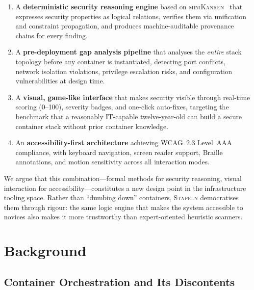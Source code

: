 \documentclass[11pt,twocolumn]{article}
\newcommand{\stapeln}{\textsc{Stapeln}\xspace}
\newcommand{\minikanren}{\textsc{miniKanren}\xspace}
\begin{document}
\begin{enumerate}[leftmargin=*]
\item A \textbf{deterministic security reasoning engine} based on
      \minikanren~\cite{byrd2010,friedman2005} that expresses security
      properties as logical relations, verifies them via unification
      and constraint propagation, and produces machine-auditable
      provenance chains for every finding.

\item A \textbf{pre-deployment gap analysis pipeline} that analyses the
      \emph{entire} stack topology before any container is instantiated,
      detecting port conflicts, network isolation violations, privilege
      escalation risks, and configuration vulnerabilities at design time.

\item A \textbf{visual, game-like interface} that makes security
      visible through real-time scoring (0--100), severity badges, and
      one-click auto-fixes, targeting the benchmark that a reasonably
      IT-capable twelve-year-old can build a secure container stack
      without prior container knowledge.

\item An \textbf{accessibility-first architecture} achieving WCAG~2.3
      Level~AAA compliance, with keyboard navigation, screen reader
      support, Braille annotations, and motion sensitivity across all
      interaction modes.
\end{enumerate}

We argue that this combination---formal methods for security reasoning,
visual interaction for accessibility---constitutes a new design point
in the infrastructure tooling space. Rather than ``dumbing down''
containers, \stapeln democratises them through rigour: the same logic
engine that makes the system accessible to novices also makes it more
trustworthy than expert-oriented heuristic scanners.


\section{Background}
\label{sec:background}

\subsection{Container Orchestration and Its Discontents}
\label{sec:bg-containers}
\end{document}
